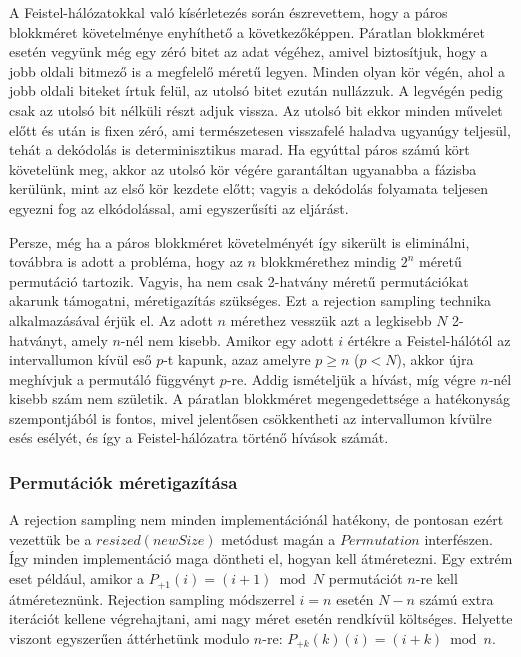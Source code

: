 \documentclass[
    parspace,
    noindent,
    nohyp,
]{elteiktdk}[2023/04/10]
\begin{document}
A Feistel-hálózatokkal való kísérletezés során észrevettem,
hogy a páros blokkméret követelménye enyhíthető a következőképpen.
Páratlan blokkméret esetén vegyünk még egy zéró bitet az adat végéhez,
amivel biztosítjuk, hogy a jobb oldali bitmező is a megfelelő méretű legyen.
Minden olyan kör végén, ahol a jobb oldali biteket írtuk felül, az utolsó bitet ezután nullázzuk.
A legvégén pedig csak az utolsó bit nélküli részt adjuk vissza.
Az utolsó bit ekkor minden művelet előtt és után is fixen zéró,
ami természetesen visszafelé haladva ugyanúgy teljesül, tehát a dekódolás is determinisztikus marad.
Ha egyúttal páros számú kört követelünk meg,
akkor az utolsó kör végére garantáltan ugyanabba a fázisba kerülünk, mint az első kör kezdete előtt;
vagyis a dekódolás folyamata teljesen egyezni fog az elkódolással, ami egyszerűsíti az eljárást.


Persze, még ha a páros blokkméret követelményét így sikerült is eliminálni,
továbbra is adott a probléma, hogy az $n$ blokkmérethez mindig $2^n$ méretű permutáció tartozik.
Vagyis, ha nem csak 2-hatvány méretű permutációkat akarunk támogatni, méretigazítás szükséges.
Ezt a rejection sampling technika alkalmazásával érjük el.
Az adott $n$ mérethez vesszük azt a legkisebb $N$ 2-hatványt, amely $n$-nél nem kisebb.
Amikor egy adott $i$ értékre a Feistel-hálótól az intervallumon kívül eső $p$-t kapunk,
azaz amelyre $p \geq n$ ($p < N$), akkor újra meghívjuk a permutáló függvényt $p$-re.
Addig ismételjük a hívást, míg végre $n$-nél kisebb szám nem születik.
A páratlan blokkméret megengedettsége a hatékonyság szempontjából is fontos,
mivel jelentősen csökkentheti az intervallumon kívülre esés esélyét,
és így a Feistel-hálózatra történő hívások számát.


\subsubsection{Permutációk méretigazítása}


A rejection sampling nem minden implementációnál hatékony,
de pontosan ezért vezettük be a $resized(newSize)$ metódust magán a $Permutation$ interfészen.
Így minden implementáció maga döntheti el, hogyan kell átméretezni.
Egy extrém eset például, amikor a $P_{+1}(i) = (i + 1) \bmod N$ permutációt $n$-re kell átméreteznünk.
Rejection sampling módszerrel $i = n$ esetén $N - n$ számú extra iterációt kellene végrehajtani,
ami nagy méret esetén rendkívül költséges.
Helyette viszont egyszerűen áttérhetünk modulo $n$-re: $P_{+k}(k)(i) = (i + k) \bmod n$.
\end{document}
